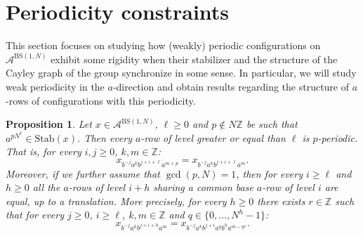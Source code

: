 \documentclass[letterpaper,10pt]{amsart}
\theoremstyle{plain}
\newtheorem{proposition}[theorem]{Proposition}
\newcommand{\BS}[1][N]{\mathrm{BS}(1,#1)}
\begin{document}
	
	\section{Periodicity constraints}\label{section:weak_periodicity}

	This section focuses on studying how (weakly) periodic configurations on $\mathcal{A}^{\BS}$ exhibit some rigidity when their stabilizer and the structure of the Cayley graph of the group synchronize in some sense. In particular, we will study weak periodicity in the $a$-direction and obtain results regarding the structure of $a$-rows of configurations with this periodicity.
	
	\begin{proposition}\label{prop:bs_periodicity_p_generalcase}
		Let $x\in \mathcal{A}^{\BS}$, $\ell\ge 0$ and $p\notin N\mathbb{Z}$ be such that $a^{pN^\ell}\in \mathrm{Stab}(x)$. Then every $a$-row of level greater or equal than $\ell$ is $p$-periodic. That is, for every $i,j\ge 0$, $k,m\in \mathbb{Z}$:
		$$
		x_{b^{-j}a^kb^{j+i+\ell}a^{m+p}}=x_{b^{-j}a^kb^{j+i+\ell}a^{m}}.
		$$
		Moreover, if we further assume that $\gcd(p,N)=1$, then for every $i\ge \ell$ and $h\ge 0$ all the $a$-rows of level $i+h$ sharing a common base $a$-row of level $i$ are equal, up to a translation. More precisely, for every $h\ge 0$ there exists $r\in \mathbb{Z}$ such that for every $j\ge 0$, $i\ge \ell$, $k,m\in \mathbb{Z}$ and $q\in \{0,\ldots,N^h-1\}$:
		$$
		x_{b^{-j}a^{k}b^{j+i+h}a^{m}}=x_{b^{-j}a^{k}b^{j+i}a^{q}b^{h}a^{m-qr}}.
		$$
		
	\end{proposition}
\end{document}
